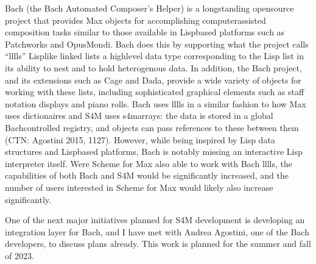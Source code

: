 \documentclass[letterpaper,10pt,english]{sphinxmanual}
\begin{document}
\sphinxAtStartPar
Bach (the Bach Automated Composer’s Helper) is a long\sphinxhyphen{}standing open\sphinxhyphen{}source
project that provides Max objects for accomplishing computer\sphinxhyphen{}assisted composition
tasks similar to those available in Lisp\sphinxhyphen{}based platforms such as Patchworks and OpusMondi.
Bach does this by supporting what the project calls “lllls” \textendash{} Lisp\sphinxhyphen{}like linked lists \textendash{} a high\sphinxhyphen{}level
data type corresponding to the Lisp list in its ability to nest and to hold heterogenous data.
In addition, the Bach project, and its extensions such as Cage and Dada, provide
a wide variety of objects for working with these lists, including sophisticated graphical
elements such as staff notation displays and piano rolls.
Bach uses lllls in a similar fashion to how Max uses dictionaires
and S4M uses s4m\sphinxhyphen{}arrays: the data is stored in a global Bach\sphinxhyphen{}controlled registry,
and objects can pass references to these between them (CTN: Agostini 2015, 11\sphinxhyphen{}27).
However, while being inspired by Lisp data structures and Lisp\sphinxhyphen{}based platforms,
Bach is notably missing an interactive Lisp interpreter itself.
Were Scheme for Max also able to work with Bach lllls, the capabilities of both Bach
and S4M would be significantly increased, and the number of users interested in Scheme
for Max would likely also increase significantly.

\sphinxAtStartPar
One of the next major initiatives planned for S4M development is
developing an integration layer for Bach, and I have met with Andrea Agostini, one
of the Bach developers, to discuss plans already. This work is planned for the summer and fall of 2023.
\end{document}
